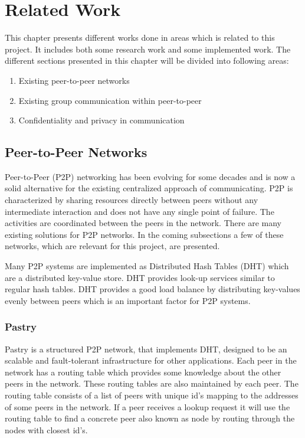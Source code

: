 \chapter{Related Work}
\label{cha:related-work}
This chapter presents different works done in areas which is related to this project. It includes both some research work and some implemented work. 
The different sections presented in this chapter will be divided into following areas:
\begin{enumerate}
	\item Existing peer-to-peer networks
	\item Existing group communication within peer-to-peer  
	\item Confidentiality and privacy in communication
\end{enumerate}

\section{Peer-to-Peer Networks}
\label{sec:p2p-networks}
Peer-to-Peer (P2P) networking has been evolving for some decades and is now a solid alternative for the existing centralized approach of communicating.
P2P is characterized by sharing resources directly between peers without any intermediate interaction and does not have any single point of failure. The activities are coordinated between the peers in the network.
There are many existing solutions for P2P networks. In the coming subsections a few of these networks, which are relevant for this project, are presented. 

Many P2P systems are implemented as Distributed Hash Tables (DHT) which are a distributed key-value store.
DHT provides look-up services similar to regular hash tables.
DHT provides a good load balance by distributing key-values evenly between peers which is an important factor for P2P systems.

\subsection{Pastry}
Pastry is a structured P2P network, that implements DHT, designed to be an scalable and fault-tolerant infrastructure for other applications. 
Each peer in the network has a routing table which provides some knowledge about the other peers in the network. These routing tables are also maintained by each peer.
The routing table consists of a list of peers with unique id's mapping to the addresses of some peers in the network.
If a peer receives a lookup request it will use the routing table to find a concrete peer also known as node by routing through the nodes with closest id's.

